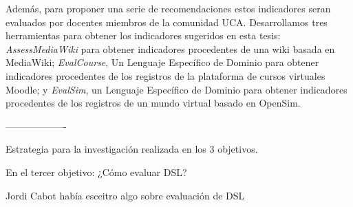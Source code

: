 \bigskip
\bigskip

Además, para proponer una serie de recomendaciones estos indicadores seran evaluados por docentes miembros de la comunidad UCA. Desarrollamos tres herramientas para obtener los indicadores sugeridos en esta tesis: \emph{AssessMediaWiki} para obtener indicadores procedentes de una wiki basada en MediaWiki; \emph{EvalCourse}, Un Lenguaje Específico de Dominio para obtener indicadores procedentes de los registros de la plataforma de cursos virtuales Moodle; y \emph{EvalSim}, un Lenguaje Específico de Dominio para obtener indicadores procedentes de los registros de un mundo virtual basado en OpenSim.


-------------------

Estrategia para la investigación realizada en los 3 objetivos.

En el tercer objetivo: ¿Cómo evaluar DSL?

Jordi Cabot había esceitro algo sobre evaluación de DSL
